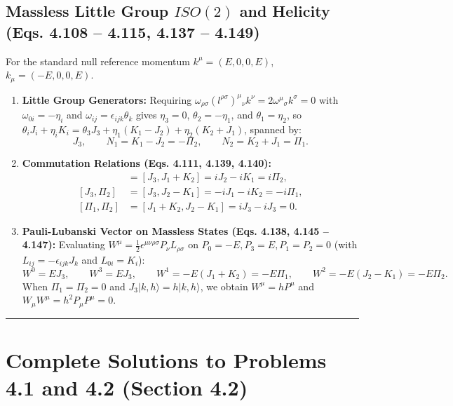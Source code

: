 \documentclass[11pt,a4paper]{article}
\begin{document}
\subsection{Massless Little Group $ISO(2)$ and Helicity (Eqs. 4.108 -- 4.115, 4.137 -- 4.149)}
For the standard null reference momentum $k^\mu = (E, 0, 0, E)$, $k_\mu = (-E, 0, 0, E)$.
\begin{enumerate}
    \item \textbf{Little Group Generators:}
    Requiring $\omega_{\rho\sigma}(l^{\rho\sigma})^\mu{}_\nu k^\nu = 2\omega^\mu{}_\sigma k^\sigma = 0$ with $\omega_{0i} = -\eta_i$ and $\omega_{ij} = \epsilon_{ijk}\theta_k$ gives $\eta_3 = 0$, $\theta_2 = -\eta_1$, and $\theta_1 = \eta_2$, so $\theta_i J_i + \eta_i K_i = \theta_3 J_3 + \eta_1(K_1 - J_2) + \eta_2(K_2 + J_1)$, spanned by:
    \begin{equation}
        J_3, \qquad N_1 = K_1 - J_2 = -\Pi_2, \qquad N_2 = K_2 + J_1 = \Pi_1.
    \end{equation}
    \item \textbf{Commutation Relations (Eqs. 4.111, 4.139, 4.140):}
    \begin{align}
        [J_3, \Pi_1] &= [J_3, J_1 + K_2] = iJ_2 - iK_1 = i\Pi_2, \\
        [J_3, \Pi_2] &= [J_3, J_2 - K_1] = -iJ_1 - iK_2 = -i\Pi_1, \\
        [\Pi_1, \Pi_2] &= [J_1 + K_2, J_2 - K_1] = iJ_3 - iJ_3 = 0.
    \end{align}
    \item \textbf{Pauli-Lubanski Vector on Massless States (Eqs. 4.138, 4.145 -- 4.147):}
    Evaluating $W^\mu = \frac{1}{2}\epsilon^{\mu\nu\rho\sigma}P_\nu L_{\rho\sigma}$ on $P_0 = -E, P_3 = E, P_1 = P_2 = 0$ (with $L_{ij} = -\epsilon_{ijk}J_k$ and $L_{0i} = K_i$):
    \begin{equation}
        W^0 = E J_3, \qquad W^3 = E J_3, \qquad W^1 = -E(J_1 + K_2) = -E\Pi_1, \qquad W^2 = -E(J_2 - K_1) = -E\Pi_2.
    \end{equation}
    When $\Pi_1 = \Pi_2 = 0$ and $J_3|k,h\rangle = h|k,h\rangle$, we obtain $W^\mu = hP^\mu$ and $W_\mu W^\mu = h^2 P_\mu P^\mu = 0$.
\end{enumerate}

\vspace{0.5em}\hrule\vspace{1em}

\section{Complete Solutions to Problems 4.1 and 4.2 (Section 4.2)}
\end{document}
